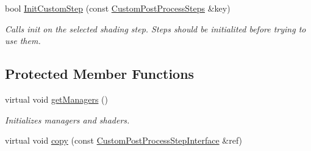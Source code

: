 \begin{DoxyCompactItemize}
\mbox{\label{class_geometry_engine_1_1_custom_shading_1_1_custom_post_process_step_interface_a6f83634a5a04d8bc681a6aa033084247}} 
bool \mbox{\hyperlink{class_geometry_engine_1_1_custom_shading_1_1_custom_post_process_step_interface_a6f83634a5a04d8bc681a6aa033084247}{Init\+Custom\+Step}} (const \mbox{\hyperlink{namespace_geometry_engine_1_1_custom_shading_a09e44ca81de5fe08c6d50271d680c4b1}{Custom\+Post\+Process\+Steps}} \&key)
\begin{DoxyCompactList}\small\item\em Calls init on the selected shading step. Steps should be initialited before trying to use them. \end{DoxyCompactList}\end{DoxyCompactItemize}
\subsection*{Protected Member Functions}
\begin{DoxyCompactItemize}
\item 
\mbox{\label{class_geometry_engine_1_1_custom_shading_1_1_custom_post_process_step_interface_a1e61dab1e0582bc758c383d3014fc3d2}} 
virtual void \mbox{\hyperlink{class_geometry_engine_1_1_custom_shading_1_1_custom_post_process_step_interface_a1e61dab1e0582bc758c383d3014fc3d2}{get\+Managers}} ()
\begin{DoxyCompactList}\small\item\em Initializes managers and shaders. \end{DoxyCompactList}\item 
virtual void \mbox{\hyperlink{class_geometry_engine_1_1_custom_shading_1_1_custom_post_process_step_interface_a9ae01d12255b61cdeb0a1b2e6d9cf785}{copy}} (const \mbox{\hyperlink{class_geometry_engine_1_1_custom_shading_1_1_custom_post_process_step_interface}{Custom\+Post\+Process\+Step\+Interface}} \&ref)
\end{DoxyCompactItemize}
